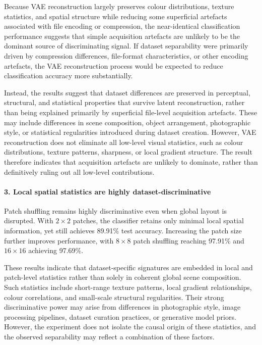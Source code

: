 Because VAE reconstruction largely preserves colour distributions, texture statistics, and spatial structure while reducing some superficial artefacts associated with file encoding or compression, the near-identical classification performance suggests that simple acquisition artefacts are unlikely to be the dominant source of discriminating signal. If dataset separability were primarily driven by compression differences, file-format characteristics, or other encoding artefacts, the VAE reconstruction process would be expected to reduce classification accuracy more substantially.

Instead, the results suggest that dataset differences are preserved in perceptual, structural, and statistical properties that survive latent reconstruction, rather than being explained primarily by superficial file-level acquisition artefacts. These may include differences in scene composition, object arrangement, photographic style, or statistical regularities introduced during dataset creation. However, VAE reconstruction does not eliminate all low-level visual statistics, such as colour distributions, texture patterns, sharpness, or local gradient structure. The result therefore indicates that acquisition artefacts are unlikely to dominate, rather than definitively ruling out all low-level contributions.

\paragraph{3. Local spatial statistics are highly dataset-discriminative}

Patch shuffling remains highly discriminative even when global layout is disrupted. With $2\times2$ patches, the classifier retains only minimal local spatial information, yet still achieves 89.91\% test accuracy. Increasing the patch size further improves performance, with $8\times8$ patch shuffling reaching 97.91\% and $16\times16$ achieving 97.69\%.

These results indicate that dataset-specific signatures are embedded in local and patch-level statistics rather than solely in coherent global scene composition. Such statistics include short-range texture patterns, local gradient relationships, colour correlations, and small-scale structural regularities. Their strong discriminative power may arise from differences in photographic style, image processing pipelines, dataset curation practices, or generative model priors. However, the experiment does not isolate the causal origin of these statistics, and the observed separability may reflect a combination of these factors.


